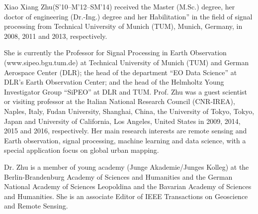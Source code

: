 \documentclass[journal]{IEEEtran}
\begin{document}
\begin{IEEEbiography}{Xiao Xiang Zhu}(S'10--M'12--SM'14) received the Master (M.Sc.) degree, her doctor of engineering (Dr.-Ing.) degree and her Habilitation” in the field of signal processing from Technical University of Munich (TUM), Munich, Germany, in 2008, 2011 and 2013, respectively.
\par
  She is currently the Professor for Signal Processing in Earth Observation (www.sipeo.bgu.tum.de) at Technical University of Munich (TUM) and German Aerospace Center (DLR); the head of the department ``EO Data Science'' at DLR's Earth Observation Center; and the head of the Helmholtz Young Investigator Group ``SiPEO'' at DLR and TUM. Prof. Zhu was a guest scientist or visiting professor at the Italian National Research Council (CNR-IREA), Naples, Italy, Fudan University, Shanghai, China, the University  of Tokyo, Tokyo, Japan and University of California, Los Angeles, United States in 2009, 2014, 2015 and 2016, respectively. Her main research interests are
  remote sensing and Earth observation, signal processing, machine learning and data science, with a special application focus on global urban mapping.

  Dr. Zhu is a member of young academy (Junge Akademie/Junges Kolleg) at the Berlin-Brandenburg Academy of Sciences and Humanities and the German National  Academy of Sciences Leopoldina and the Bavarian Academy of Sciences and Humanities. She is an associate Editor of IEEE Transactions on Geoscience and Remote Sensing.
  \end{IEEEbiography}
\end{document}
